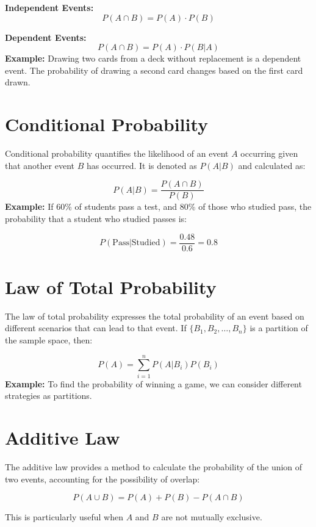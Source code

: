 \documentclass{article}
\begin{document}
\vspace{1em}
\textbf{Independent Events:}
\[
P(A \cap B) = P(A) \cdot P(B)
\]

\textbf{Dependent Events:}
\[
P(A \cap B) = P(A) \cdot P(B|A)
\]
\vspace{1em}
\textbf{Example:} Drawing two cards from a deck without replacement is a dependent event. The probability of drawing a second card changes based on the first card drawn.

\newpage

\section{Conditional Probability}
Conditional probability quantifies the likelihood of an event \(A\) occurring given that another event \(B\) has occurred. It is denoted as \(P(A|B)\) and calculated as:

\[
P(A|B) = \frac{P(A \cap B)}{P(B)}
\]
\vspace{1em}
\textbf{Example:} If 60\% of students pass a test, and 80\% of those who studied pass, the probability that a student who studied passes is:

\[
P(\text{Pass}|\text{Studied}) = \frac{0.48}{0.6} = 0.8
\]

\newpage

\section{Law of Total Probability}
The law of total probability expresses the total probability of an event based on different scenarios that can lead to that event. If \(\{B_1, B_2, \ldots, B_n\}\) is a partition of the sample space, then:

\[
P(A) = \sum_{i=1}^{n} P(A|B_i) P(B_i)
\]
\vspace{1em}
\textbf{Example:} To find the probability of winning a game, we can consider different strategies as partitions.

\newpage

\section{Additive Law}
The additive law provides a method to calculate the probability of the union of two events, accounting for the possibility of overlap:

\[
P(A \cup B) = P(A) + P(B) - P(A \cap B)
\]

This is particularly useful when \(A\) and \(B\) are not mutually exclusive.
\end{document}
